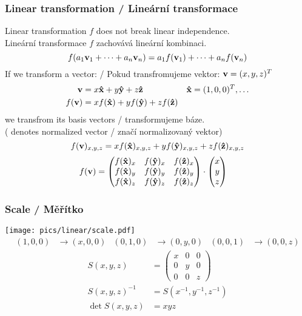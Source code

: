 \begin{frame}\frametitle{Linear transformation / Lineární transformace}\scriptsize
  Linear transformation $f$ does not break linear independence.\\
  Lineární transformace $f$ zachovává lineární kombinaci.
  \begin{equation*}
    f(a_1\mathbf{v}_1 + \dotsb + a_n\mathbf{v}_n) = a_1f(\mathbf{v}_1) + \dotsb + a_nf(\mathbf{v}_n)
  \end{equation*}
  \pause
  If we transform a vector: / Pokud transfromujeme vektor: $\mathbf{v} = (x,y,z)^T$
  \begin{align*}
    \mathbf{v} &= x\mathbf{\hat{x}} + y\mathbf{\hat{y}} + z\mathbf{\hat{z}} & \mathbf{\hat{x}} = (1,0,0)^T, \dotsc \\
    f(\mathbf{v}) &= xf(\mathbf{\hat{x}}) + yf(\mathbf{\hat{y}}) + zf(\mathbf{\hat{z}})
  \end{align*}
  we transfrom its basis vectors / transformujeme báze.\\
  ( denotes normalized vector / značí normalizovaný vektor)
  \pause
  \begin{equation*}
    f(\mathbf{v})_{x,y,z} = xf(\mathbf{\hat{x}})_{x,y,z} + yf(\mathbf{\hat{y}})_{x,y,z} + zf(\mathbf{\hat{z}})_{x,y,z}
  \end{equation*}
  \pause
  \begin{align*}
    f(\mathbf{v}) &= \begin{pmatrix}
    f(\mathbf{\hat{x}})_x&f(\mathbf{\hat{y}})_x&f(\mathbf{\hat{z}})_x\\
    f(\mathbf{\hat{x}})_y&f(\mathbf{\hat{y}})_y&f(\mathbf{\hat{z}})_y\\
    f(\mathbf{\hat{x}})_z&f(\mathbf{\hat{y}})_z&f(\mathbf{\hat{z}})_z
  \end{pmatrix}\cdot\begin{pmatrix}x\\y\\z\end{pmatrix}
  \end{align*}
\end{frame}


\begin{frame}\frametitle{Scale / Měřítko}
  \texttt{[image: pics/linear/scale.pdf]}
  \begin{align*}
    (1,0,0)&\rightarrow(x,0,0) & (0,1,0)&\rightarrow(0,y,0) & (0,0,1)&\rightarrow(0,0,z)
  \end{align*}
  \pause
  \begin{align*}
    S(x, y, z) &= \begin{pmatrix}
      x & 0 & 0 \\
      0 & y & 0 \\
      0 & 0 & z
    \end{pmatrix} \\
    S(x, y, z)^{-1} &= S(x^{-1}, y^{-1}, z^{-1}) \\
    \det S(x,y,z) &= xyz 
  \end{align*}
\end{frame}

